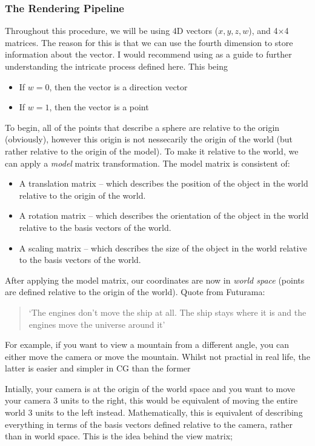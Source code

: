 \documentclass[main.tex]{subfiles}
\begin{document}
\subsubsection*{The Rendering Pipeline}
Throughout this procedure, we will be using 4D vectors ($x, y, z, w$), and 4$\times$4 matrices. The reason for this is that we can use the fourth dimension to store information
about the vector. I would recommend using \cite{EssenceLinearAlgebra} as a guide to further understanding the intricate process defined here. This being
\begin{itemize}
    \item If $w = 0$, then the vector is a direction vector
    \item If $w = 1$, then the vector is a point
\end{itemize}
To begin, all of the points that describe a sphere are relative to the origin (obviously), however this origin is not nessecarily the origin
of the world (but rather relative to the origin of the model). To make it relative to the world, we can apply a \textit{model} matrix transformation.
The model matrix is consistent of:
\begin{itemize}
    \item A translation matrix -- which describes the position of the object in the world relative to the origin of the world.
    \item A rotation matrix -- which describes the orientation of the object in the world relative to the basis vectors of the world.
    \item A scaling matrix -- which describes the size of the object in the world relative to the basis vectors of the world.
\end{itemize}
After applying the model matrix, our coordinates are now in \textit{world space} (points are defined relative to the origin of the world).
Quote from Futurama:
\begin{quote}
    `The engines don't move the ship at all. The ship stays where it is and the engines move the universe around it'
\end{quote}
For example, if you want to view a mountain from a different angle, you can either move the camera or move the mountain.
Whilst not practial in real life, the latter is easier and simpler in CG than the former\@

Intially, your camera is at the origin of the world space and
you want to move your camera 3 units to the right, this would be equivalent of moving the entire world 3 units to the left instead.
Mathematically, this is equivalent of describing everything in terms of the basis vectors defined relative to the camera,
rather than in world space. This is the idea behind the view matrix;
\end{document}
